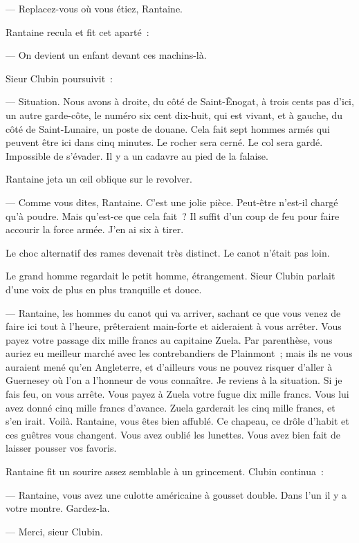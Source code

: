 \documentclass[french,twoside]{book} %
\begin{document}
— Replacez-vous où vous étiez, Rantaine.\par
Rantaine recula et fit cet aparté :\par
— On devient un enfant devant ces machins-là.\par
Sieur Clubin poursuivit :\par
— Situation. Nous avons à droite, du côté de Saint-Ênogat, à trois cents pas d’ici, un autre garde-côte, le numéro six cent dix-huit, qui est vivant, et à gauche, du côté de Saint-Lunaire, un poste de douane. Cela fait sept hommes armés qui peuvent être ici dans cinq  minutes. Le rocher sera cerné. Le col sera gardé. Impossible de s’évader. Il y a un cadavre au pied de la falaise.\par
Rantaine jeta un œil oblique sur le revolver.\par
— Comme vous dites, Rantaine. C’est une jolie pièce. Peut-être n’est-il chargé qu’à poudre. Mais qu’est-ce que cela fait ? Il suffit d’un coup de feu pour faire accourir la force armée. J’en ai six à tirer.\par
Le choc alternatif des rames devenait très distinct. Le canot n’était pas loin.\par
Le grand homme regardait le petit homme, étrangement. Sieur Clubin parlait d’une voix de plus en plus tranquille et douce.\par
— Rantaine, les hommes du canot qui va arriver, sachant ce que vous venez de faire ici tout à l’heure, prêteraient main-forte et aideraient à vous arrêter. Vous payez votre passage dix mille francs au capitaine Zuela. Par parenthèse, vous auriez eu meilleur marché avec les contrebandiers de Plainmont ; mais ils ne vous auraient mené qu’en Angleterre, et d’ailleurs vous ne pouvez risquer d’aller à Guernesey où l’on a l’honneur de vous connaître. Je reviens à la situation. Si je fais feu, on vous arrête. Vous payez à Zuela votre fugue dix mille francs. Vous lui avez donné cinq mille francs d’avance. Zuela garderait les cinq mille francs, et s’en irait. Voilà. Rantaine, vous êtes bien affublé. Ce chapeau, ce drôle d’habit et ces guêtres vous changent. Vous avez oublié les lunettes. Vous avez bien fait de laisser pousser vos favoris.\par
Rantaine fit un sourire assez semblable à un grincement. Clubin continua :\par
 — Rantaine, vous avez une culotte américaine à gousset double. Dans l’un il y a votre montre. Gardez-la.\par
— Merci, sieur Clubin.\par
\end{document}
